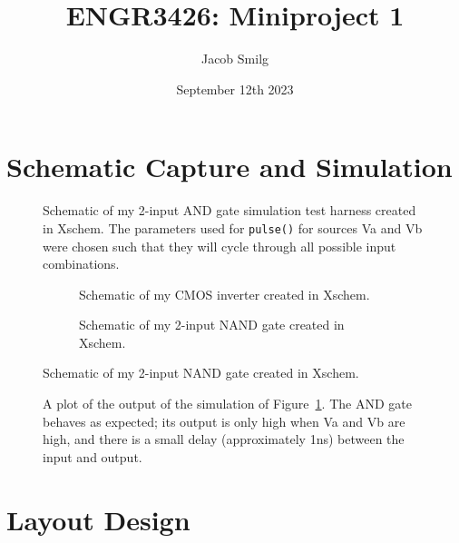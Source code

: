 \documentclass{article}
\title{ENGR3426: Miniproject 1}
\author{Jacob Smilg}
\date{September 12th 2023}
\begin{document}
\maketitle

\section{Schematic Capture and Simulation}

\begin{figure}[!ht]
    \centering
    
    \caption{Schematic of my 2-input AND gate simulation test harness created in Xschem. The parameters used for \texttt{pulse()} for sources Va and Vb were chosen such that they will cycle through all possible input combinations.}\label{fig:and_sim_schem}
\end{figure}

\captionsetup[subfigure]{margin=10pt}

\begin{figure}[!ht]
    \centering
    \begin{subfigure}{.5\textwidth}
        \centering
        
        \caption{Schematic of my CMOS inverter created in Xschem.}\label{fig:inverter_schem}
    \end{subfigure}%
    \begin{subfigure}{.5\textwidth}
        \centering
        
        \caption{Schematic of my 2-input NAND gate created in Xschem.}\label{fig:nand_schem}
    \end{subfigure}
\end{figure}

\begin{figure}[p]
    \centering
    
    \caption{A plot of the output of the simulation of Figure~\ref{fig:and_sim_schem}. The AND gate behaves as expected; its output is only high when Va and Vb are high, and there is a small delay (approximately 1ns) between the input and output.}\label{fig:simplot}
\end{figure}
\pagebreak

\section{Layout Design}
\end{document}
